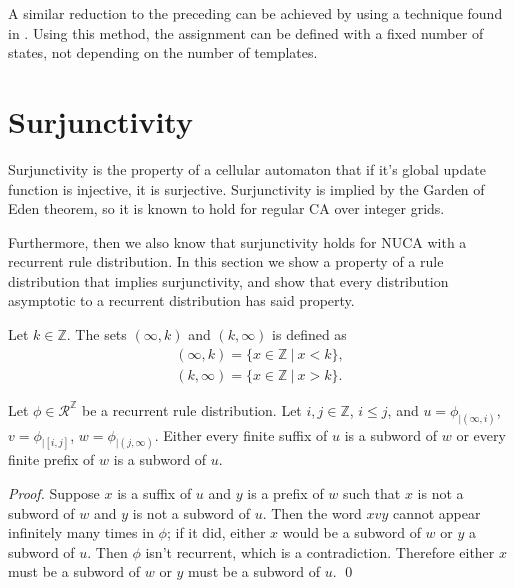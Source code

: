 \documentclass[runningheads]{llncs}
\newcommand{\Z}{\mathbb{Z}}
\newcommand{\set}[2]{\{ #1 \: | \: #2 \}}
\begin{document}
A similar reduction to the preceding can be achieved by using a technique found in \cite{salo}. Using this method, the assignment can be defined with a fixed number of states, not depending on the number of templates.


\section{Surjunctivity}

Surjunctivity is the property of a cellular automaton that if it's global update function is injective, it is surjective. Surjunctivity is implied by the Garden of Eden theorem, so it is known to hold for regular CA over integer grids. 

Furthermore, then we also know that surjunctivity holds for NUCA with a recurrent rule distribution. In this section we show a property of a rule distribution that implies surjunctivity, and show that every distribution asymptotic to a recurrent distribution has said property.

\begin{definition}
Let $k \in \Z$. The sets $(\infty,k)$ and $(k,\infty)$ is defined as 
\begin{align*}
(\infty, k) = \set{x \in \Z}{x < k}, \\
(k, \infty) = \set{x \in \Z}{x > k}.
\end{align*}
\end{definition}



\begin{lemma} \label{recur}

Let $\phi \in \mathcal{R}^\Z$ be a recurrent rule distribution. Let $i,j \in \Z$, $i \leq j$, and $u = \phi_{|(\infty,i)}$, $v = \phi_{|[i,j]}$, $w= \phi_{|(j,\infty)}$. Either every finite suffix of $u$ is a subword of $w$ or every finite prefix of $w$ is a subword of $u$.
\end{lemma}

\begin{proof}
Suppose $x$ is a suffix of $u$ and $y$ is a prefix of $w$ such that $x$ is not a subword of $w$ and $y$ is not a subword of $u$. Then the word $xvy$ cannot appear infinitely many times in $\phi$; if it did, either $x$ would be a subword of $w$ or $y$ a subword of $u$. Then $\phi$ isn't recurrent, which is a contradiction. Therefore either $x$ must be a subword of $w$ or $y$ must be a subword of $u$.
\qed
\end{proof}
\end{document}
